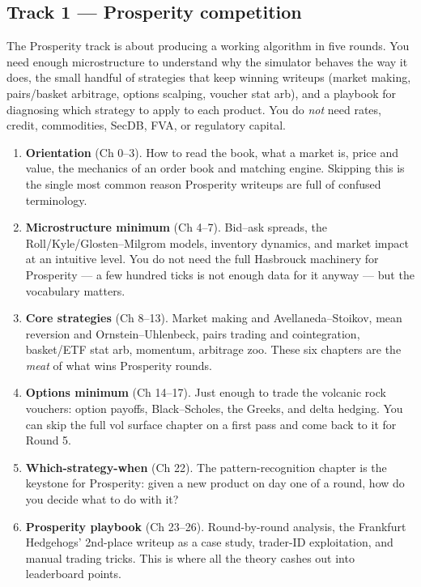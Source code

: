 \subsection{Track 1 --- Prosperity competition}

The Prosperity track is about producing a working algorithm in five
rounds. You need enough microstructure to understand why the simulator
behaves the way it does, the small handful of strategies that keep
winning writeups (market making, pairs/basket arbitrage, options
scalping, voucher stat arb), and a playbook for diagnosing which
strategy to apply to each product. You do \emph{not} need rates,
credit, commodities, SecDB, FVA, or regulatory capital.

\begin{enumerate}
  \item \textbf{Orientation} (Ch 0--3). How to read the book, what a
        market is, price and value, the mechanics of an order book and
        matching engine. Skipping this is the single most common
        reason Prosperity writeups are full of confused terminology.
  \item \textbf{Microstructure minimum} (Ch 4--7). Bid--ask spreads,
        the Roll/Kyle/Glosten--Milgrom models, inventory dynamics, and
        market impact at an intuitive level. You do not need the full
        Hasbrouck machinery for Prosperity --- a few hundred ticks is
        not enough data for it anyway --- but the vocabulary matters.
  \item \textbf{Core strategies} (Ch 8--13). Market making and
        Avellaneda--Stoikov, mean reversion and Ornstein--Uhlenbeck,
        pairs trading and cointegration, basket/ETF stat arb,
        momentum, arbitrage zoo. These six chapters are the
        \emph{meat} of what wins Prosperity rounds.
  \item \textbf{Options minimum} (Ch 14--17). Just enough to trade the
        volcanic rock vouchers: option payoffs, Black--Scholes, the
        Greeks, and delta hedging. You can skip the full vol surface
        chapter on a first pass and come back to it for Round 5.
  \item \textbf{Which-strategy-when} (Ch 22). The pattern-recognition
        chapter is the keystone for Prosperity: given a new product on
        day one of a round, how do you decide what to do with it?
  \item \textbf{Prosperity playbook} (Ch 23--26). Round-by-round
        analysis, the Frankfurt Hedgehogs' 2nd-place writeup as a case
        study, trader-ID exploitation, and manual trading tricks. This
        is where all the theory cashes out into leaderboard points.
\end{enumerate}

